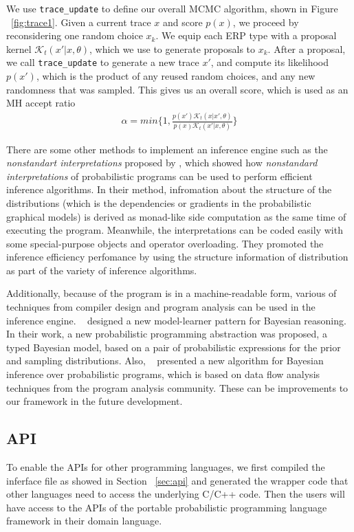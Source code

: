 We use \texttt{trace\_update} to define our overall MCMC algorithm, shown in Figure ~\ref{fig:trace1}. Given a current trace $x$ and score $p(x)$, we proceed by reconsidering one random choice $x_k$. We equip each ERP type with a proposal kernel $\mathscr{K}_t(x'|x,\theta)$, which we use to generate proposals to $x_k$. After a proposal, we call \texttt{trace\_update} to generate a new trace $x'$, and compute its likelihood $p(x')$, which is the product of any reused random choices, and any new randomness that was sampled. This gives us an overall score, which is used as an MH accept ratio
\begin{align*}
  \alpha = min \{1, \frac{p(x')\mathscr{K}_t(x|x′,\theta)}{p(x)\mathscr{K}_t(x'|x,\theta)} \}
\end{align*}

There are some other methods to implement an inference engine such as the \textit{nonstandart interpretations} proposed by \cite{nonstandard}, which showed how \textit{nonstandard interpretations} of probabilistic programs can be used to perform efficient inference algorithms. In their method, infromation about the structure of the distributions (which is the dependencies or gradients in the probabilistic graphical models) is derived as monad-like side computation as the same time of executing the program. Meanwhile, the interpretations can be coded easily with some special-purpose objects and operator overloading. They promoted the inference efficiency perfomance by using the structure information of distribution as part of the variety of inference algorithms.

Additionally, because of the program is in a machine-readable form, various of techniques from compiler design and program analysis can be used in the inference engine. ~\cite{gordon2013} designed a new model-learner pattern for Bayesian reasoning. In their work, a new probabilistic programming abstraction was proposed, a typed Bayesian model, based on a pair of probabilistic expressions for the prior and sampling distributions. Also, ~\cite{dataflow} presented a new algorithm for Bayesian inference over probabilistic programs, which is based on data flow analysis techniques from the program analysis community. These can be improvements to our framework in the future development.

\subsection{API}
To enable the APIs for other programming languages, we first compiled the inferface file as showed in Section ~\ref{sec:api} and generated the wrapper code that other languages need to access the underlying C/C++ code. Then the users will have access to the APIs of the portable probabilistic programming language framework in their domain language. 

